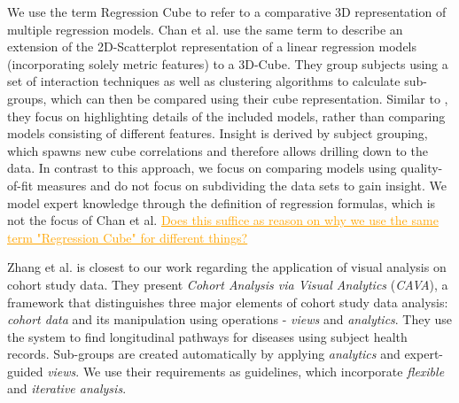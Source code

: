 \documentclass[journal]{style/vgtc} 			          %
\newcommand{\com}[1]{\textcolor{orange}{\uline{#1}}}
\begin{document}
We use the term Regression Cube to refer to a comparative 3D representation of multiple regression models.
Chan et al. \cite{Chan} use the same term to describe an extension of the 2D-Scatterplot representation of a linear regression models (incorporating solely metric features) to a 3D-Cube.
They group subjects using a set of interaction techniques as well as clustering algorithms to calculate sub-groups, which can then be compared using their cube representation.
Similar to \cite{Piringer}, they focus on highlighting details of the included models, rather than comparing models consisting of different features.
Insight is derived by subject grouping, which spawns new cube correlations and therefore allows drilling down to the data.
In contrast to this approach, we focus on comparing models using quality-of-fit measures and do not focus on subdividing the data sets to gain insight.
We model expert knowledge through the definition of regression formulas, which is not the focus of Chan et al.
\com{Does this suffice as reason on why we use the same term "Regression Cube" for different things?}

Zhang et al. \cite{Zhang2014} is closest to our work regarding the application of visual analysis on cohort study data.
They present \emph{Cohort Analysis via Visual Analytics} (\emph{CAVA}), a framework that distinguishes three major elements of cohort study data analysis: \emph{cohort data} and its manipulation using operations - \emph{views} and \emph{analytics}.
They use the system to find longitudinal pathways for diseases using subject health records.
Sub-groups are created automatically by applying \emph{analytics} and expert-guided \emph{views}.
We use their requirements as guidelines, which incorporate \emph{flexible} and \emph{iterative analysis}. %
\end{document}
